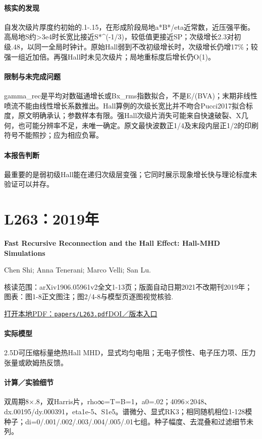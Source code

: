 \paragraph{核实的发现}自发次级片厚度约初始的.1-.15，在形成阶段局地a*B*/eta近常数，近压强平衡。高局地S约>3e4时长宽比接近S*\textasciicircum{}(-1/3)，较低值更接近SP；次级增长2.3对初级.48，以同一全局时钟计。原始Hall弱到不改初级增长时，次级增长仍增17\%；较强一组近加倍。再强Hall时未见次级片；局地重标度后增长仍O(1)。

\paragraph{限制与未完成问题}gamma\_rec是平均对数磁通增长或Bx\_rms指数拟合，不是E/(BVA)；末期非线性喷流不能由线性增长系数推出。Hall算例的次级长宽比并不吻合Pucci2017拟合标度，原文明确承认；参数样本有限。强Hall次级片消失可能来自快速破裂、X几何，也可能分辨率不足，未唯一确定。原文最快波数正1/4及末段内层正1/2的印刷符号不能照抄；应为相应负幂。

\paragraph{本报告判断}最重要的是弱初级Hall能在递归次级层变强；它同时展示现象增长快与理论标度未验证可以并存。

\section{L263：2019年}\label{paper:L263}

\textbf{Fast Recursive Reconnection and the Hall Effect: Hall-MHD Simulations}\citep{L263}\

Chen Shi;  Anna Tenerani;  Marco Velli;  San Lu.

\textsf{核读范围：}arXiv1906.05961v2全文1-13页；版面自动日期2021不改期刊2019年；\textsf{图表：}图1-8正文图注；图2/4-8与模型页逐图视觉核验.

\href{run:papers/L263.pdf}{打开本地PDF：\texttt{papers/L263.pdf}}\quad\href{https://doi.org/10.3847/1538-4357/ab33ff}{DOI／版本入口}

\paragraph{实际模型}2.5D可压缩标量绝热Hall MHD，显式均匀电阻；无电子惯性、电子压力项、压力张量或欧姆热反馈。

\paragraph{计算／实验细节}双周期8×.8，双Harris片，rho∞=T=B=1，a0=.02；4096×2048、dx.00195/dy.000391，eta1e-5、S1e5。谱微分、显式RK3；相同随机相位1-128模种子；di=0/.001/.002/.003/.004/.005/.01七组。种子幅度、去混叠和过滤细节未列。

